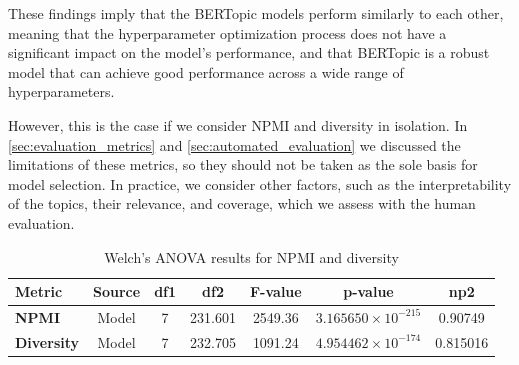 These findings imply that the BERTopic models perform similarly to each other, meaning that the hyperparameter optimization process does not have a significant impact on the model's performance, and that BERTopic is a robust model that can achieve good performance across a wide range of hyperparameters.

However, this is the case if we consider NPMI and diversity in isolation. In \cref{sec:evaluation_metrics} and \cref{sec:automated_evaluation} we discussed the limitations of these metrics, so they should not be taken as the sole basis for model selection. In practice, we consider other factors, such as the interpretability of the topics, their relevance, and coverage, which we assess with the human evaluation.

\begin{table}[ht]
    \centering
    \caption{Welch's ANOVA results for NPMI and diversity}
    \label{tab:welch_anova}
    \begin{tabular}{lcccccc}
        \toprule
        \textbf{Metric}    & \textbf{Source} & \textbf{df1} & \textbf{df2} & \textbf{F-value} & \textbf{p-value}            & \textbf{np2} \\
        \midrule
        \textbf{NPMI}      & Model           & 7            & 231.601      & 2549.36          & $3.165650 \times 10^{-215}$ & 0.90749      \\
        \textbf{Diversity} & Model           & 7            & 232.705      & 1091.24          & $4.954462 \times 10^{-174}$ & 0.815016     \\
        \bottomrule
    \end{tabular}
\end{table}


